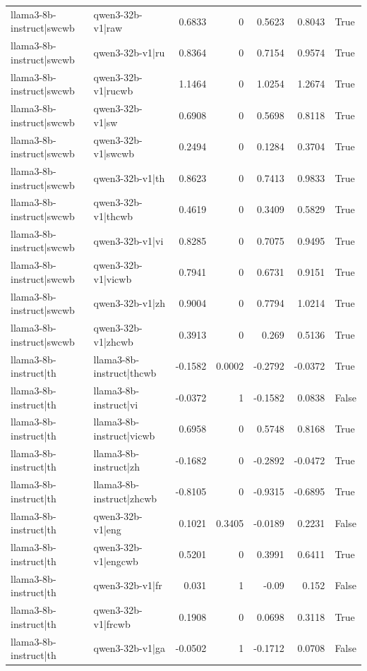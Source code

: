 \begin{table}
\begin{tabular}{l l r r r r l}
llama3-8b-instruct|swcwb & qwen3-32b-v1|raw & 0.6833 & 0 & 0.5623 & 0.8043 & True \\
llama3-8b-instruct|swcwb & qwen3-32b-v1|ru & 0.8364 & 0 & 0.7154 & 0.9574 & True \\
llama3-8b-instruct|swcwb & qwen3-32b-v1|rucwb & 1.1464 & 0 & 1.0254 & 1.2674 & True \\
llama3-8b-instruct|swcwb & qwen3-32b-v1|sw & 0.6908 & 0 & 0.5698 & 0.8118 & True \\
llama3-8b-instruct|swcwb & qwen3-32b-v1|swcwb & 0.2494 & 0 & 0.1284 & 0.3704 & True \\
llama3-8b-instruct|swcwb & qwen3-32b-v1|th & 0.8623 & 0 & 0.7413 & 0.9833 & True \\
llama3-8b-instruct|swcwb & qwen3-32b-v1|thcwb & 0.4619 & 0 & 0.3409 & 0.5829 & True \\
llama3-8b-instruct|swcwb & qwen3-32b-v1|vi & 0.8285 & 0 & 0.7075 & 0.9495 & True \\
llama3-8b-instruct|swcwb & qwen3-32b-v1|vicwb & 0.7941 & 0 & 0.6731 & 0.9151 & True \\
llama3-8b-instruct|swcwb & qwen3-32b-v1|zh & 0.9004 & 0 & 0.7794 & 1.0214 & True \\
llama3-8b-instruct|swcwb & qwen3-32b-v1|zhcwb & 0.3913 & 0 & 0.269 & 0.5136 & True \\
llama3-8b-instruct|th & llama3-8b-instruct|thcwb & -0.1582 & 0.0002 & -0.2792 & -0.0372 & True \\
llama3-8b-instruct|th & llama3-8b-instruct|vi & -0.0372 & 1 & -0.1582 & 0.0838 & False \\
llama3-8b-instruct|th & llama3-8b-instruct|vicwb & 0.6958 & 0 & 0.5748 & 0.8168 & True \\
llama3-8b-instruct|th & llama3-8b-instruct|zh & -0.1682 & 0 & -0.2892 & -0.0472 & True \\
llama3-8b-instruct|th & llama3-8b-instruct|zhcwb & -0.8105 & 0 & -0.9315 & -0.6895 & True \\
llama3-8b-instruct|th & qwen3-32b-v1|eng & 0.1021 & 0.3405 & -0.0189 & 0.2231 & False \\
llama3-8b-instruct|th & qwen3-32b-v1|engcwb & 0.5201 & 0 & 0.3991 & 0.6411 & True \\
llama3-8b-instruct|th & qwen3-32b-v1|fr & 0.031 & 1 & -0.09 & 0.152 & False \\
llama3-8b-instruct|th & qwen3-32b-v1|frcwb & 0.1908 & 0 & 0.0698 & 0.3118 & True \\
llama3-8b-instruct|th & qwen3-32b-v1|ga & -0.0502 & 1 & -0.1712 & 0.0708 & False \\

\end{tabular}
\end{table}
